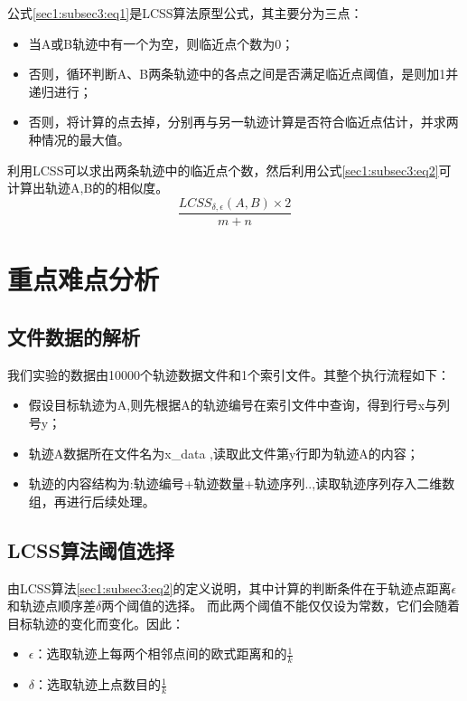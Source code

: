 \documentclass[UTF8]{ctexart}
\begin{document}
公式\ref{sec1:subsec3:eq1}是LCSS算法原型公式，其主要分为三点：
\begin{itemize}
	\item 当A或B轨迹中有一个为空，则临近点个数为0；
	\item 否则，循环判断A、B两条轨迹中的各点之间是否满足临近点阈值，是则加1并递归进行；
	\item 否则，将计算的点去掉，分别再与另一轨迹计算是否符合临近点估计，并求两种情况的最大值。
\end{itemize}

利用LCSS可以求出两条轨迹中的临近点个数，然后利用公式\ref{sec1:subsec3:eq2}可计算出轨迹A,B的的相似度。
\begin{equation}
\label{sec1:subsec3:eq2}
\frac{LCSS_{\delta,\epsilon}(A,B)\times2}{m+n}
\end{equation}
\section{重点难点分析}\label{sec2}
\subsection{文件数据的解析}

我们实验的数据由10000个轨迹数据文件和1个索引文件。其整个执行流程如下：

\begin{itemize}
	\item 假设目标轨迹为A,则先根据A的轨迹编号在索引文件中查询，得到行号x与列号y；
	\item 轨迹A数据所在文件名为x\_data ,读取此文件第y行即为轨迹A的内容；
	\item 轨迹的内容结构为:轨迹编号+轨迹数量+轨迹序列..,读取轨迹序列存入二维数组，再进行后续处理。
\end{itemize}

\subsection{LCSS算法阈值选择}

由LCSS算法\ref{sec1:subsec3:eq2}的定义说明，其中计算的判断条件在于轨迹点距离$\epsilon$和轨迹点顺序差$\delta$两个阈值的选择。
而此两个阈值不能仅仅设为常数，它们会随着目标轨迹的变化而变化。因此：

\begin{itemize}
	\item $\epsilon$：选取轨迹上每两个相邻点间的欧式距离和的$\frac{1}{k}$
	\item $\delta$：选取轨迹上点数目的$\frac{1}{k}$
\end{itemize}
\end{document}
